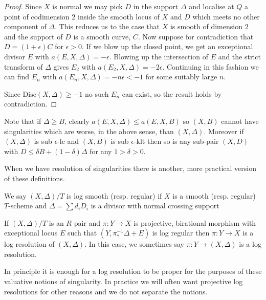\documentclass[a4paper,12pt]{book}
\begin{document}
\begin{proof}
Since $X$ is normal we may pick $D$ in the support $\Delta$ and localise at $Q$ a point of codimension $2$ inside the smooth locus of $X$ and $D$ which meets no other component of $\Delta$. This reduces us to the case that $X$ is smooth of dimension $2$ and the support of $D$ is a smooth curve, $C$. Now suppose for contradiction that $D=(1+\epsilon)C$ for $\epsilon > 0$. If we blow up the closed point, we get an exceptional divisor $E$ with $a(E,X,\Delta)=-\epsilon$. Blowing up the intersection of $E$ and the strict transform of $\Delta$ gives $E_{2}$ with $a(E_{2},X,\Delta)=-2\epsilon$. Continuing in this fashion we can find $E_{n}$ with $a(E_{n},X,\Delta)=-n\epsilon< -1$ for some suitably large $n$.

Since $\text{Disc}(X,\Delta) \geq -1$ no such $E_{n}$ can exist, so the result holds by contradiction.
\end{proof}

Note that if $\Delta \geq B$, clearly $a(E,X,\Delta) \leq a(E,X,B)$ so $(X,B)$ cannot have singularities which are worse, in the above sense, than $(X,\Delta)$. Moreover if $(X,\Delta)$ is sub $\epsilon$-lc and $(X,B)$ is sub $\epsilon$-klt then so is any sub-pair  $(X,D)$ with $D \leq \delta B+(1-\delta)\Delta$ for any $1>\delta >0$.

When we have resolution of singularities there is another, more practical version of these definitions.

\begin{definition}
	
	We say $(X,\Delta)/T$ is log smooth (resp. regular) if $X$ is a smooth (resp. regular) $T$-scheme and $\Delta=\sum d_{i}D_{i}$ is a divisor with normal crossing support
	
	If $(X,\Delta)/T$ is an $R$ pair and $\pi:Y \to X$ is projective, birational morphism with exceptional locus $E$ such that $(Y,\pi^{-1}_{*}\Delta+E)$ is log regular then $\pi:Y\to X$ is a log resolution of $(X,\Delta)$. In this case, we sometimes say $\pi:Y \to (X,\Delta)$ is a log resolution.
	
\end{definition}

\begin{remark}
	
	In principle it is enough for a log resolution to be proper for the purposes of these valuative notions of singularity. In practice we will often want projective log resolutions for other reasons and we do not separate the notions.
	
	\end{remark}
\end{document}
